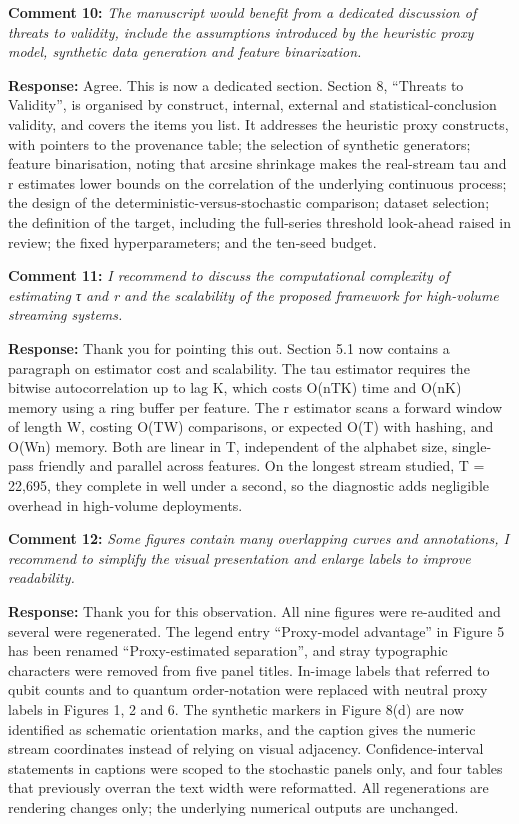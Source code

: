 \documentclass[
  11pt,
]{article}
\begin{document}
\textbf{Comment 10:} \emph{The manuscript would benefit from a dedicated
discussion of threats to validity, include the assumptions introduced by
the heuristic proxy model, synthetic data generation and feature
binarization.}

\textbf{Response:} Agree. This is now a dedicated section. Section 8,
``Threats to Validity'', is organised by construct, internal, external
and statistical-conclusion validity, and covers the items you list. It
addresses the heuristic proxy constructs, with pointers to the
provenance table; the selection of synthetic generators; feature
binarisation, noting that arcsine shrinkage makes the real-stream tau
and r estimates lower bounds on the correlation of the underlying
continuous process; the design of the deterministic-versus-stochastic
comparison; dataset selection; the definition of the target, including
the full-series threshold look-ahead raised in review; the fixed
hyperparameters; and the ten-seed budget.

\textbf{Comment 11:} \emph{I recommend to discuss the computational
complexity of estimating τ and r and the scalability of the proposed
framework for high-volume streaming systems.}

\textbf{Response:} Thank you for pointing this out. Section 5.1 now
contains a paragraph on estimator cost and scalability. The tau
estimator requires the bitwise autocorrelation up to lag K, which costs
O(nTK) time and O(nK) memory using a ring buffer per feature. The r
estimator scans a forward window of length W, costing O(TW) comparisons,
or expected O(T) with hashing, and O(Wn) memory. Both are linear in T,
independent of the alphabet size, single-pass friendly and parallel
across features. On the longest stream studied, T = 22,695, they
complete in well under a second, so the diagnostic adds negligible
overhead in high-volume deployments.

\textbf{Comment 12:} \emph{Some figures contain many overlapping curves
and annotations, I recommend to simplify the visual presentation and
enlarge labels to improve readability.}

\textbf{Response:} Thank you for this observation. All nine figures were
re-audited and several were regenerated. The legend entry ``Proxy-model
advantage'' in Figure 5 has been renamed ``Proxy-estimated separation'',
and stray typographic characters were removed from five panel titles.
In-image labels that referred to qubit counts and to quantum
order-notation were replaced with neutral proxy labels in Figures 1, 2
and 6. The synthetic markers in Figure 8(d) are now identified as
schematic orientation marks, and the caption gives the numeric stream
coordinates instead of relying on visual adjacency. Confidence-interval
statements in captions were scoped to the stochastic panels only, and
four tables that previously overran the text width were reformatted. All
regenerations are rendering changes only; the underlying numerical
outputs are unchanged.
\end{document}
